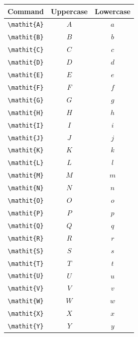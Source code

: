 \documentclass[12pt,a4paper]{article}
\begin{document}
\begin{longtable}{|c|c|c|}
\hline
\textbf{Command} & \textbf{Uppercase} & \textbf{Lowercase} \\
\hline
\verb|\mathit{A}| & $\mathit{A}$ & $\mathit{a}$ \\ %
\verb|\mathit{B}| & $\mathit{B}$ & $\mathit{b}$ \\ %
\verb|\mathit{C}| & $\mathit{C}$ & $\mathit{c}$ \\ %
\verb|\mathit{D}| & $\mathit{D}$ & $\mathit{d}$ \\ %
\verb|\mathit{E}| & $\mathit{E}$ & $\mathit{e}$ \\ %
\verb|\mathit{F}| & $\mathit{F}$ & $\mathit{f}$ \\ %
\verb|\mathit{G}| & $\mathit{G}$ & $\mathit{g}$ \\ %
\verb|\mathit{H}| & $\mathit{H}$ & $\mathit{h}$ \\ %
\verb|\mathit{I}| & $\mathit{I}$ & $\mathit{i}$ \\ %
\verb|\mathit{J}| & $\mathit{J}$ & $\mathit{j}$ \\ %
\verb|\mathit{K}| & $\mathit{K}$ & $\mathit{k}$ \\ %
\verb|\mathit{L}| & $\mathit{L}$ & $\mathit{l}$ \\ %
\verb|\mathit{M}| & $\mathit{M}$ & $\mathit{m}$ \\ %
\verb|\mathit{N}| & $\mathit{N}$ & $\mathit{n}$ \\ %
\verb|\mathit{O}| & $\mathit{O}$ & $\mathit{o}$ \\ %
\verb|\mathit{P}| & $\mathit{P}$ & $\mathit{p}$ \\ %
\verb|\mathit{Q}| & $\mathit{Q}$ & $\mathit{q}$ \\ %
\verb|\mathit{R}| & $\mathit{R}$ & $\mathit{r}$ \\ %
\verb|\mathit{S}| & $\mathit{S}$ & $\mathit{s}$ \\ %
\verb|\mathit{T}| & $\mathit{T}$ & $\mathit{t}$ \\ %
\verb|\mathit{U}| & $\mathit{U}$ & $\mathit{u}$ \\ %
\verb|\mathit{V}| & $\mathit{V}$ & $\mathit{v}$ \\ %
\verb|\mathit{W}| & $\mathit{W}$ & $\mathit{w}$ \\ %
\verb|\mathit{X}| & $\mathit{X}$ & $\mathit{x}$ \\ %
\verb|\mathit{Y}| & $\mathit{Y}$ & $\mathit{y}$ \\ %

\end{longtable}
\end{document}
